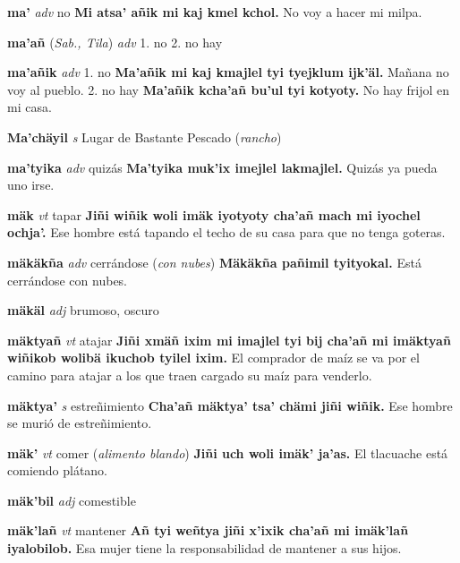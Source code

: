 \documentclass[10pt]{scrbook}
\newcommand{\entry}[1]{\textbf{#1}}
\newcommand{\onedefinition}[1]{#1.}
\newcommand{\partofspeech}[1]{\textit{#1}}
\newcommand{\spanishtranslation}[1]{#1}
\newcommand{\clarification}[1]{(\textit{#1})}
\newcommand{\cholexample}[1]{\textbf{#1}}
\newcommand{\exampletranslation}[1]{#1}
\newcommand{\relevantdialect}[1]{(\textit{#1})}
\begin{document}
\begin{multicols}{2}
\entry{ma'}
\partofspeech{adv}
\spanishtranslation{no}
\cholexample{Mi atsa' añik mi kaj kmel kchol.}
\exampletranslation{No voy a hacer mi milpa.}

\entry{ma'añ}
\relevantdialect{Sab., Tila}
\partofspeech{adv}
\onedefinition{1}
\spanishtranslation{no}
\onedefinition{2}
\spanishtranslation{no hay}

\entry{ma'añik}
\partofspeech{adv}
\onedefinition{1}
\spanishtranslation{no}
\cholexample{Ma'añik mi kaj kmajlel tyi tyejklum ijk'äl.}
\exampletranslation{Mañana no voy al pueblo.}
\onedefinition{2}
\spanishtranslation{no hay}
\cholexample{Ma'añik kcha'añ bu'ul tyi kotyoty.}
\exampletranslation{No hay frijol en mi casa.}

\entry{Ma'chäyil}
\partofspeech{s}
\spanishtranslation{Lugar de Bastante Pescado}
\clarification{rancho}

\entry{ma'tyika}
\partofspeech{adv}
\spanishtranslation{quizás}
\cholexample{Ma'tyika muk'ix imejlel lakmajlel.}
\exampletranslation{Quizás ya pueda uno irse.}

\entry{mäk}
\partofspeech{vt}
\spanishtranslation{tapar}
\cholexample{Jiñi wiñik woli imäk iyotyoty cha'añ mach mi iyochel ochja'.}
\exampletranslation{Ese hombre está tapando el techo de su casa para que no tenga goteras.}

\entry{mäkäkña}
\partofspeech{adv}
\spanishtranslation{cerrándose}
\clarification{con nubes}
\cholexample{Mäkäkña pañimil tyityokal.}
\exampletranslation{Está cerrándose con nubes.}

\entry{mäkäl}
\partofspeech{adj}
\spanishtranslation{brumoso, oscuro}

\entry{mäktyañ}
\partofspeech{vt}
\spanishtranslation{atajar}
\cholexample{Jiñi xmäñ ixim mi imajlel tyi bij cha'añ mi imäktyañ wiñikob wolibä ikuchob tyilel ixim.}
\exampletranslation{El comprador de maíz se va por el camino para atajar a los que traen cargado su maíz para venderlo.}

\entry{mäktya'}
\partofspeech{s}
\spanishtranslation{estreñimiento}
\cholexample{Cha'añ mäktya' tsa' chämi jiñi wiñik.}
\exampletranslation{Ese hombre se murió de estreñimiento.}

\entry{mäk'}
\partofspeech{vt}
\spanishtranslation{comer}
\clarification{alimento blando}
\cholexample{Jiñi uch woli imäk' ja'as.}
\exampletranslation{El tlacuache está comiendo plátano.}

\entry{mäk'bil}
\partofspeech{adj}
\spanishtranslation{comestible}

\entry{mäk'lañ}
\partofspeech{vt}
\spanishtranslation{mantener}
\cholexample{Añ tyi weñtya jiñi x'ixik cha'añ mi imäk'lañ iyalobilob.}
\exampletranslation{Esa mujer tiene la responsabilidad de mantener a sus hijos.}


\end{multicols}
\end{document}
